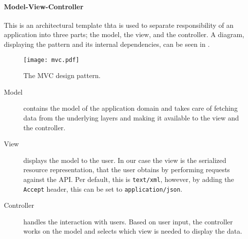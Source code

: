 \paragraph{Model-View-Controller}\cite{aspmvc}
This is an architectural template thta is used to separate responsibility of an application into three parts; the model, the view, and the controller.
A diagram, displaying the pattern and its internal dependencies, can be seen in .

\begin{figure}[h]
\begin{center}
\texttt{[image: mvc.pdf]}
\caption{The MVC design pattern.}
\label{mvcdiagram}
\end{center}
\end{figure}

\begin{description}
\item [Model] contains the model of the application domain and takes care of fetching data from the underlying layers and making it available to the view and the controller.

\item [View] displays the model to the user.
In our case the view is the serialized resource representation, that the user obtains by performing requests against the API.
Per default, this is \texttt{text/xml}, however, by adding the \texttt{Accept} header\cite[Section 14]{http_specification}, this can be set to \texttt{application/json}.

\item [Controller] handles the interaction with users.
Based on user input, the controller works on the model and selects which view is needed to display the data.
\end{description}
